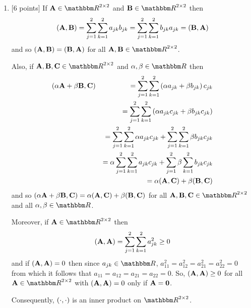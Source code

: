 \begin{solution}
\begin{enumerate}
\item {[6 points]} If $\BA\in\R^{2\times2}$ and $\BB\in\R^{2\times2}$ then
\[
({\bf A},{\bf B})=\sum_{j=1}^2 \sum_{k=1}^2 a_{jk} b_{jk}=\sum_{j=1}^2 \sum_{k=1}^2 b_{jk} a_{jk}=({\bf B},{\bf A})
\]
and so $({\bf A},{\bf B})=({\bf B},{\bf A})$ for all $\BA,\BB\in\R^{2\times2}$.

Also, if $\BA,\BB,\BC\in\R^{2\times2}$ and $\alpha,\beta\in\R$ then
\begin{eqnarray*}
(\alpha{\bf A}+\beta{\bf B},{\bf C})&&=\sum_{j=1}^2 \sum_{k=1}^2 \left(\alpha a_{jk}+\beta b_{jk}\right)c_{jk}
\\
&&=\sum_{j=1}^2 \sum_{k=1}^2 \left(\alpha a_{jk}c_{jk}+\beta b_{jk}c_{jk}\right)
\\
&&=\sum_{j=1}^2 \sum_{k=1}^2 \alpha a_{jk}c_{jk}+\sum_{j=1}^2 \sum_{k=1}^2\beta b_{jk}c_{jk}
\\
&&=\alpha \sum_{j=1}^2 \sum_{k=1}^2 a_{jk}c_{jk}+\sum_{j=1}^2 \beta \sum_{k=1}^2b_{jk}c_{jk}
\\
&&=\alpha({\bf A},{\bf C})+\beta({\bf B},{\bf C})
\end{eqnarray*}
and so $(\alpha{\bf A}+\beta{\bf B},{\bf C})=\alpha({\bf A},{\bf C})+\beta({\bf B},{\bf C})$ for all $\BA,\BB,\BC\in\R^{2\times2}$ and all $\alpha,\beta\in\R$.

Moreover, if $\BA\in\R^{2\times2}$ then
\[
({\bf A},{\bf A})=\sum_{j=1}^2 \sum_{k=1}^2 a_{jk}^2\ge 0
\]
and if $({\bf A},{\bf A})=0$ then since $a_{jk}\in\R$, $a_{11}^2=a_{12}^2=a_{21}^2=a_{22}^2=0$ from which it follows that $a_{11}=a_{12}=a_{21}=a_{22}=0$. So, $({\bf A},{\bf A})\ge0$ for all $\BA\in\R^{2\times2}$ with $({\bf A},{\bf A})=0$ only if ${\bf A}={\bf 0}$.

Consequently, $(\cdot,\cdot)$ is an inner product on $\R^{2\times2}$.




\end{enumerate}
\end{solution}

